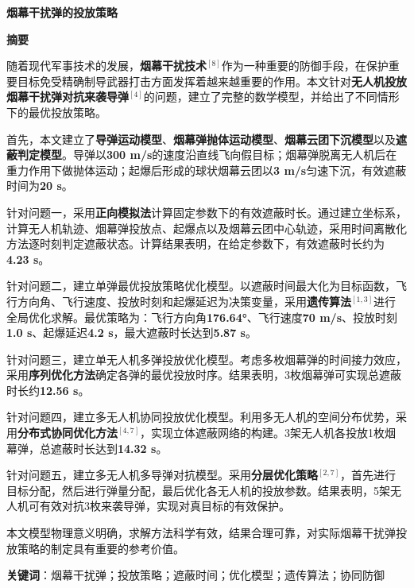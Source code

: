 \documentclass[12pt,a4paper]{article}
\begin{document}
\begin{center}
{\LARGE\bfseries 烟幕干扰弹的投放策略}
\end{center}

\vspace{-1em}

\begin{center}
\textbf{\Large 摘要}
\end{center}

随着现代军事技术的发展，\textbf{烟幕干扰技术}$^{[8]}$作为一种重要的防御手段，在保护重要目标免受精确制导武器打击方面发挥着越来越重要的作用。本文针对\textbf{无人机投放烟幕干扰弹对抗来袭导弹}$^{[4]}$的问题，建立了完整的数学模型，并给出了不同情形下的最优投放策略。

首先，本文建立了\textbf{导弹运动模型}、\textbf{烟幕弹抛体运动模型}、\textbf{烟幕云团下沉模型}以及\textbf{遮蔽判定模型}。导弹以\textbf{300 m/s}的速度沿直线飞向假目标；烟幕弹脱离无人机后在重力作用下做抛体运动；起爆后形成的球状烟幕云团以\textbf{3 m/s}匀速下沉，有效遮蔽时间为\textbf{20 s}。

针对问题一，采用\textbf{正向模拟法}计算固定参数下的有效遮蔽时长。通过建立坐标系，计算无人机轨迹、烟幕弹投放点、起爆点以及烟幕云团中心轨迹，采用时间离散化方法逐时刻判定遮蔽状态。计算结果表明，在给定参数下，有效遮蔽时长约为\textbf{4.23 s}。

针对问题二，建立单弹最优投放策略优化模型。以遮蔽时间最大化为目标函数，飞行方向角、飞行速度、投放时刻和起爆延迟为决策变量，采用\textbf{遗传算法}$^{[1,3]}$进行全局优化求解。最优策略为：飞行方向角\textbf{176.64°}、飞行速度\textbf{70 m/s}、投放时刻\textbf{1.0 s}、起爆延迟\textbf{4.2 s}，最大遮蔽时长达到\textbf{5.87 s}。

针对问题三，建立单无人机多弹投放优化模型。考虑多枚烟幕弹的时间接力效应，采用\textbf{序列优化方法}确定各弹的最优投放时序。结果表明，3枚烟幕弹可实现总遮蔽时长约\textbf{12.56 s}。

针对问题四，建立多无人机协同投放优化模型。利用多无人机的空间分布优势，采用\textbf{分布式协同优化方法}$^{[4,7]}$，实现立体遮蔽网络的构建。3架无人机各投放1枚烟幕弹，总遮蔽时长达到\textbf{14.32 s}。

针对问题五，建立多无人机多导弹对抗模型。采用\textbf{分层优化策略}$^{[2,7]}$，首先进行目标分配，然后进行弹量分配，最后优化各无人机的投放参数。结果表明，5架无人机可有效对抗3枚来袭导弹，实现对真目标的有效保护。

本文模型物理意义明确，求解方法科学有效，结果合理可靠，对实际烟幕干扰弹投放策略的制定具有重要的参考价值。

\textbf{关键词}：烟幕干扰弹；投放策略；遮蔽时间；优化模型；遗传算法；协同防御
\end{document}
